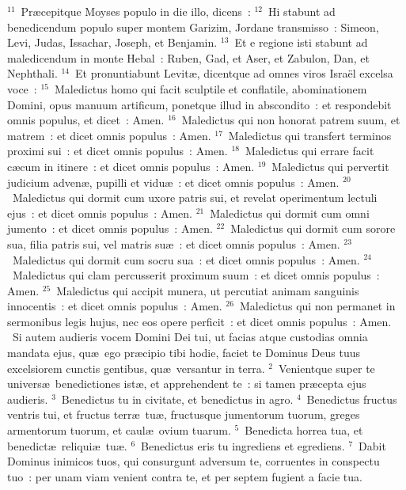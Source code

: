 ${}^{11}$~Pr\ae cepitque Moyses populo in die illo, dicens~:
${}^{12}$~Hi stabunt ad benedicendum populo super montem Garizim, Jordane transmisso~: Simeon, Levi, Judas, Issachar, Joseph, et Benjamin.
${}^{13}$~Et e regione isti stabunt ad maledicendum in monte Hebal~: Ruben, Gad, et Aser, et Zabulon, Dan, et Nephthali.
${}^{14}$~Et pronuntiabunt Levit\ae , dicentque ad omnes viros Isra\"el excelsa voce~:
${}^{15}$~Maledictus homo qui facit sculptile et conflatile, abominationem Domini, opus manuum artificum, ponetque illud in abscondito~: et respondebit omnis populus, et dicet~: Amen.
${}^{16}$~Maledictus qui non honorat patrem suum, et matrem~: et dicet omnis populus~: Amen.
${}^{17}$~Maledictus qui transfert terminos proximi sui~: et dicet omnis populus~: Amen.
${}^{18}$~Maledictus qui errare facit c\ae cum in itinere~: et dicet omnis populus~: Amen.
${}^{19}$~Maledictus qui pervertit judicium adven\ae , pupilli et vidu\ae~: et dicet omnis populus~: Amen.
${}^{20}$~Maledictus qui dormit cum uxore patris sui, et revelat operimentum lectuli ejus~: et dicet omnis populus~: Amen.
${}^{21}$~Maledictus qui dormit cum omni jumento~: et dicet omnis populus~: Amen.
${}^{22}$~Maledictus qui dormit cum sorore sua, filia patris sui, vel matris su\ae~: et dicet omnis populus~: Amen.
${}^{23}$~Maledictus qui dormit cum socru sua~: et dicet omnis populus~: Amen.
${}^{24}$~Maledictus qui clam percusserit proximum suum~: et dicet omnis populus~: Amen.
${}^{25}$~Maledictus qui accipit munera, ut percutiat animam sanguinis innocentis~: et dicet omnis populus~: Amen.
${}^{26}$~Maledictus qui non permanet in sermonibus legis hujus, nec eos opere perficit~: et dicet omnis populus~: Amen.
~\lettrine[lines=10,image=true,loversize=0.05,lraise=-0.03]{S}{}i autem audieris vocem Domini Dei tui, ut facias atque custodias omnia mandata ejus, qu\ae\ ego pr\ae cipio tibi hodie, faciet te Dominus Deus tuus excelsiorem cunctis gentibus, qu\ae\ versantur in terra.
${}^{2}$~Venientque super te univers\ae\ benedictiones ist\ae , et apprehendent te~: si tamen pr\ae cepta ejus audieris.
${}^{3}$~Benedictus tu in civitate, et benedictus in agro.
${}^{4}$~Benedictus fructus ventris tui, et fructus terr\ae\ tu\ae , fructusque jumentorum tuorum, greges armentorum tuorum, et caul\ae\ ovium tuarum.
${}^{5}$~Benedicta horrea tua, et benedict\ae\ reliqui\ae\ tu\ae .
${}^{6}$~Benedictus eris tu ingrediens et egrediens.
${}^{7}$~Dabit Dominus inimicos tuos, qui consurgunt adversum te, corruentes in conspectu tuo~: per unam viam venient contra te, et per septem fugient a facie tua.
